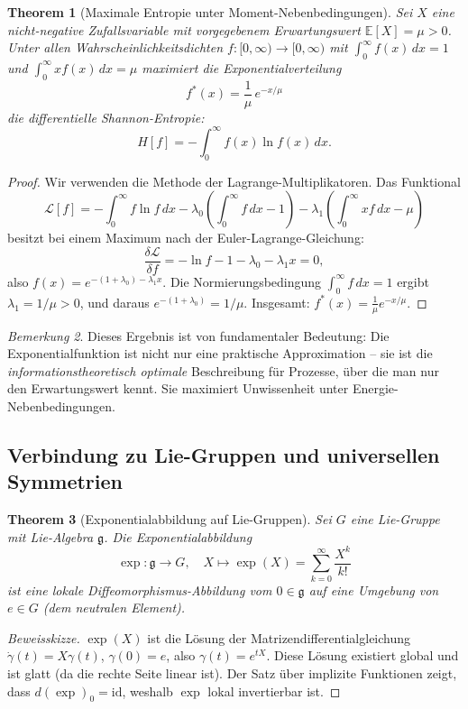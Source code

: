 ﻿\documentclass[12pt,a4paper]{article}
\newtheorem{theorem}{Theorem}[section]
\theoremstyle{definition}
\theoremstyle{remark}
\newtheorem{remark}[theorem]{Bemerkung}
\begin{document}
\begin{theorem}[Maximale Entropie unter Moment-Nebenbedingungen]
\label{thm:max_entropie}
Sei $X$ eine nicht-negative Zufallsvariable mit vorgegebenem Erwartungswert $\mathbb{E}[X] = \mu > 0$. Unter allen Wahrscheinlichkeitsdichten $f: [0,\infty) \to [0,\infty)$ mit $\int_0^\infty f(x)\,dx = 1$ und $\int_0^\infty x f(x)\,dx = \mu$ maximiert die \emph{Exponentialverteilung}
\begin{equation}
f^*(x) = \frac{1}{\mu}\,e^{-x/\mu}
\end{equation}
die differentielle Shannon-Entropie:
\begin{equation}
H[f] = -\int_0^\infty f(x)\ln f(x)\,dx.
\end{equation}
\end{theorem}
\begin{proof}
Wir verwenden die Methode der Lagrange-Multiplikatoren. Das Funktional
\[
\mathcal{L}[f] = -\int_0^\infty f\ln f\,dx - \lambda_0\left(\int_0^\infty f\,dx - 1\right) - \lambda_1\left(\int_0^\infty xf\,dx - \mu\right)
\]
besitzt bei einem Maximum nach der Euler-Lagrange-Gleichung:
\[
\frac{\delta \mathcal{L}}{\delta f} = -\ln f - 1 - \lambda_0 - \lambda_1 x = 0,
\]
also $f(x) = e^{-(1+\lambda_0)-\lambda_1 x}$. Die Normierungsbedingung $\int_0^\infty f\,dx = 1$ ergibt $\lambda_1 = 1/\mu > 0$, und daraus $e^{-(1+\lambda_0)} = 1/\mu$. Insgesamt: $f^*(x) = \frac{1}{\mu}e^{-x/\mu}$. 
\end{proof}

\begin{remark}
Dieses Ergebnis ist von fundamentaler Bedeutung: Die Exponentialfunktion ist nicht nur eine praktische Approximation -- sie ist die \emph{informationstheoretisch optimale} Beschreibung für Prozesse, über die man nur den Erwartungswert kennt. Sie maximiert Unwissenheit unter Energie-Nebenbedingungen.
\end{remark}

\subsection{Verbindung zu Lie-Gruppen und universellen Symmetrien}

\begin{theorem}[Exponentialabbildung auf Lie-Gruppen]
\label{thm:lie_exp}
Sei $G$ eine Lie-Gruppe mit Lie-Algebra $\mathfrak{g}$. Die Exponentialabbildung
\begin{equation}
\exp: \mathfrak{g} \to G, \quad X \mapsto \exp(X) = \sum_{k=0}^\infty \frac{X^k}{k!}
\end{equation}
ist eine lokale Diffeomorphismus-Abbildung vom $0 \in \mathfrak{g}$ auf eine Umgebung von $e \in G$ (dem neutralen Element).
\end{theorem}
\begin{proof}[Beweisskizze]
$\exp(X)$ ist die Lösung der Matrizendifferentialgleichung $\dot{\gamma}(t) = X\gamma(t)$, $\gamma(0) = e$, also $\gamma(t) = e^{tX}$. Diese Lösung existiert global und ist glatt (da die rechte Seite linear ist). Der Satz über implizite Funktionen zeigt, dass $d(\exp)_0 = \text{id}$, weshalb $\exp$ lokal invertierbar ist. 
\end{proof}
\end{document}
